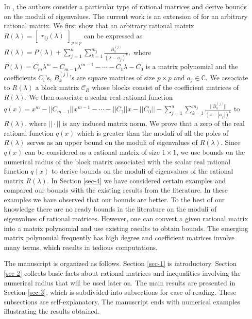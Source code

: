 \documentclass[12pt, reqno]{amsart}
\theoremstyle{definition}
\theoremstyle{remark}
\numberwithin{equation}{section}
\begin{document}
In \cite{Hadimani-Pallavi-Jayaraman}, the authors consider a 
particular type of rational matrices and derive bounds on the moduli of 
eigenvalues. The current work is an extension of \cite{Hadimani-Pallavi-Jayaraman} 
for an arbitrary rational matrix. We first show that an arbitrary rational matrix 
$R(\lambda)= \begin{bmatrix}
r_{ij}(\lambda)
\end{bmatrix} _{p\times p}$ can be expressed as $R(\lambda) = P(\lambda) +
\displaystyle \sum_{j=1}^{n} \sum_{k=1}^{m_j} \frac{B_k^{(j)}}{(\lambda-a_j)^k},$
where $P(\lambda)=C_m\lambda^m- C_{m-1}\lambda^{m-1} - \cdots -C_1 \lambda - C_0$ 
is a matrix polynomial and the coefficients $C_i$'s, $B_k^{(j)}$'s are square matrices of size 
$p\times p$ and $a_j \in \mathbb{C}$. We associate to $R(\lambda)$ a block matrix 
$\mathcal{C}_R$ whose blocks consist of the coefficient matrices of $R(\lambda)$. 
We then associate a scalar real rational function $q(x) = x^m-||C_{m-1}||x^{m-1}-
\cdots - ||C_1|| x - ||C_0|| - \displaystyle \sum_{j=1}^{n} \sum_{k=1}^{m_j} 
\frac{||B_k^{(j)}||}{(x- |a_j|)^k}$ to $R(\lambda)$, where $||\cdot ||$ is any 
induced matrix norm. We prove that a zero of the real rational function $q(x)$ 
which is greater than the moduli of all the poles of $R(\lambda)$ serves as an 
upper bound on the moduli of eigenvalues of $R(\lambda)$. Since $q(x)$ can 
be considered as a rational matrix of size $1 \times 1$, we use bounds on the 
numerical radius of the block matrix associated with the scalar real rational 
function $q(x)$ to derive bounds on the moduli of eigenvalues of the rational 
matrix $R(\lambda)$. In Section \ref{sec-4} we have considered certain examples 
and compared our bounds with the existing results from the literature. In these 
examples we have observed that our bounds are better. To the best of our 
knowledge there are no ready bounds in the literature on the moduli of 
eigenvalues of rational matrices. However, one can convert a given rational 
matrix into a matrix polynomial and use existing results to obtain bounds. 
The emerging matrix polynomial frequently has high degree and coefficient matrices involve many 
terms, which results in tedious computations. 

The manuscript is organized as follows. Section \ref{sec-1} is introductory. 
Section \ref{sec-2} collects basic facts about rational matrices and inequalities 
involving the numerical radius that will be used later on. The main results 
are presented in Section \ref{sec-3}, which is subdivided into subsections for 
ease of reading. These subsections are self-explanatory. The manuscript ends 
with numerical examples illustrating the results obtained. 
\end{document}
